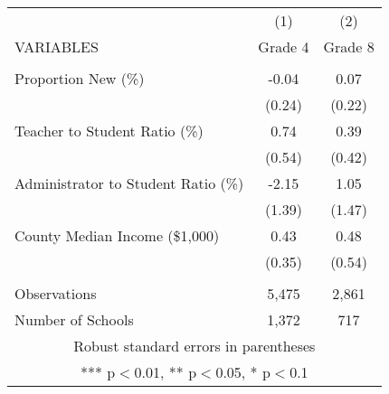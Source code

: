 \begin{tabular}{lcc}
\hline \hline
 & (1) & (2) \\
VARIABLES & Grade 4 & Grade 8 \\ \hline
 &  &  \\
Proportion New (\%) & -0.04 & 0.07 \\
 & (0.24) & (0.22) \\
Teacher to Student Ratio (\%) & 0.74 & 0.39 \\
 & (0.54) & (0.42) \\
Administrator to Student Ratio (\%) & -2.15 & 1.05 \\
 & (1.39) & (1.47) \\
County Median Income (\$1,000) & 0.43 & 0.48 \\
 & (0.35) & (0.54) \\
 &  &  \\
Observations & 5,475 & 2,861 \\
 Number of Schools & 1,372 & 717 \\ \hline\hline
\multicolumn{3}{c}{ Robust standard errors in parentheses} \\
\multicolumn{3}{c}{ *** p$<$0.01, ** p$<$0.05, * p$<$0.1} \\
\end{tabular}
